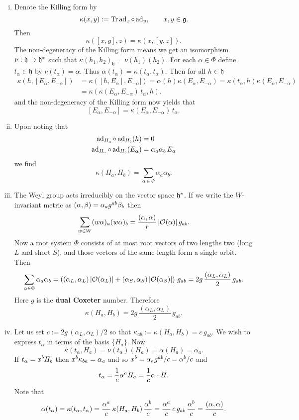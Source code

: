 \documentclass{article}
\begin{document}
\begin{enumerate}[(i)]
	\item Denote the Killing form by 
	\begin{equation}
	\kappa(x,y):=\operatorname{Tr} \operatorname{ad}_x\circ \operatorname{ad}_y, \qquad x,y\in\mathfrak{g}.
	\end{equation}
	Then
	$$ \kappa([x,y],z)=\kappa(x,[y,z]).
	$$
	The non-degeneracy of the Killing form means we get an
	isomorphism $\nu:
	{\mathfrak{h}}\rightarrow{\mathfrak{h}}\sp\ast$ such that
	$\kappa(h_1 ,  h_2 )_{\mathfrak{h}}=\nu(h_1)(h_2)$. For each $\alpha\in\Phi$ define $t_\alpha\in \mathfrak{h}$ by $\nu(t_\alpha)=\alpha$.  Thus $\alpha(t_\alpha)=\kappa(t_\alpha,t_\alpha)$.
	Then for all $h\in {\mathfrak{h}}$
	\begin{align*}
	\kappa(h, [E_\alpha,E_{-\alpha}])&=\kappa([h, E_\alpha],E_{-\alpha}])=\alpha(h)
	\kappa(E_\alpha,E_{-\alpha} )=\kappa(t_\alpha,h )\kappa(E_\alpha,E_{-\alpha}  )\\
	&=\kappa(\kappa(E_\alpha,E_{-\alpha}  )\, t_\alpha,h  ).
	\end{align*}
	and the non-degeneracy of the Killing form  now yields that
	$$ [E_\alpha,E_{-\alpha}]=\kappa(E_\alpha,E_{-\alpha}  )\, t_\alpha.$$
	
	\item Upon noting that
	\begin{align*}
	\operatorname{ad}_{H_a}\circ\operatorname{ad}_{H_b}(h)&=0
	\\
	\operatorname{ad}_{H_a}\circ\operatorname{ad}_{H_b}(E_\alpha)&=\alpha_a \alpha_b\,E_\alpha
	\end{align*}
	we find
	$$
	\kappa(H_a,H_b)=\sum_{\alpha\in \Phi}\alpha_a \alpha_b.
	$$
	
	\item The Weyl group acts irreducibly on the vector space $\mathfrak{h}\sp\ast$. If we write the $W$-invariant metric as $(\alpha,\beta)=\alpha_a g\sp{ab}\beta_b$ then
	$$\sum_{w\in W} (w\alpha)_a (w\alpha)_b =\frac{(\alpha,\alpha)}{r}\,|\mathcal{O}(\alpha)|\, g_{ab}.$$
	Now a root system $\Phi$ consists of at most root vectors of two lengths two (long $L$ and short $S$), and those vectors of the same length form a single orbit. Then
	$$\sum_{\alpha\in \Phi}\alpha_a \alpha_b
	=\left( (\alpha_L,\alpha_L)\,|\mathcal{O}(\alpha_L)|+(\alpha_S,\alpha_S)\,|\mathcal{O}(\alpha_S)|\right) \, g_{ab}
	=2g\,\frac{ (\alpha_L,\alpha_L)}2\, g_{ab}
	.
	$$
	Here $g$ is the \textbf{dual Coxeter} number. Therefore
	$$
	\kappa(H_a,H_b)=2g\,\frac{ (\alpha_L,\alpha_L)}2\, g_{ab}.
	$$
	
	\item Let us set $c:=2g\, (\alpha_L,\alpha_L)/2$ so that $\kappa_{ab}:=\kappa(H_a,H_b)=c\, g_{ab}$. 
	We wish to express
	$t_\alpha$ in terms of the basis $\{H_a\}$. Now 
	$$\kappa(t_\alpha,H_a)=\nu(t_\alpha)(H_a)=\alpha(H_a)=\alpha_a.$$
	If $t_\alpha=x\sp{b}H_b$ then $x\sp{b}\kappa_{ba}=\alpha_a$ and so $x\sp{b}=\alpha_a g\sp{ab}/c=
	\alpha\sp{b}/c$ and
	$$t_\alpha=\frac1{c}\alpha\sp{a}H_a=\frac1{c}\alpha\cdot H.$$
	Note that
	$$\alpha(t_\alpha)=\kappa(t_\alpha,t_\alpha)=\frac{\alpha\sp{a}}{c}\,\kappa(H_a,H_b)\,\frac{\alpha\sp{b}}{c}
	=\frac{\alpha\sp{a}}{c}\,c\, g_{ab}\,\frac{\alpha\sp{b}}{c}=\frac{(\alpha,\alpha)}{c}.
	$$
	

\end{enumerate}
\end{document}
